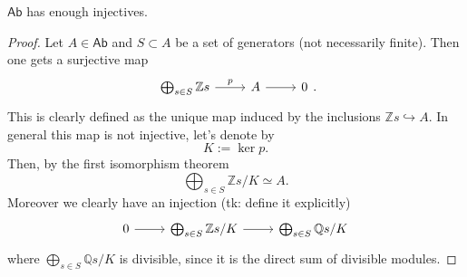\documentclass[../Main]{subfiles}
\begin{document}
\begin{prop}[]
	$\mathsf{Ab}$ has enough injectives.
\end{prop}
\begin{proof}
	Let $A \in \mathsf{Ab}$ and $S \subset A$ be a
	set of generators (not necessarily finite).
	Then one gets a surjective map
	\begin{equation}
	\begin{tikzcd}
		\bigoplus_{s \in S} \mathbb{Z}s \arrow[r, "p", rightarrow] &
		A \arrow[r, "", rightarrow] &
		0
	\end{tikzcd}
	.\end{equation} 
	This is clearly defined as the unique map induced by the inclusions $\mathbb{Z}s \hookrightarrow A$.
	In general this map is not injective, let's denote by
	\begin{equation}
	K := \ker p
	.\end{equation} 
	Then, by the first isomorphism theorem
	\begin{equation}
	\bigoplus_{s \in S}\mathbb{Z}s / K \simeq A
	.\end{equation} 
	Moreover we clearly have an injection
	(tk: define it explicitly)
	\begin{equation}
	\begin{tikzcd}
		0 \arrow[r, "", rightarrow] &
		\bigoplus_{s \in S} \mathbb{Z}s/K \arrow[r, "", rightarrow] &
		\bigoplus_{s \in S} \mathbb{Q}s/K
	\end{tikzcd}
	\end{equation} 
	where $\bigoplus_{s \in S}\mathbb{Q}s/K$ is divisible, since it is the direct sum
	of divisible modules.
\end{proof}
\end{document}
